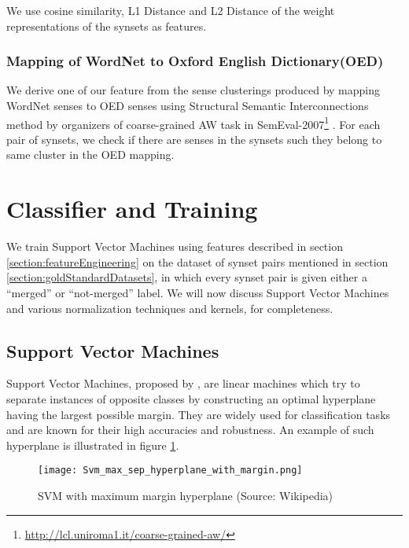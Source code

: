 We use cosine similarity, L1 Distance and L2 Distance of the weight representations of the synsets as features.

\subsubsection{Mapping of WordNet to Oxford English Dictionary(OED)} 
We derive one of our feature from the sense clusterings produced by mapping WordNet senses to OED senses using Structural Semantic Interconnections method \citep{Navigli05SSI} by organizers of coarse-grained AW task in SemEval-2007\footnote{\url{http://lcl.uniroma1.it/coarse-grained-aw/}} \citep{navigli-litkowski:SemEval-2007}. For each pair of synsets, we check if there are senses in the synsets such they belong to same cluster in the OED mapping.

\section{Classifier and Training}
\label{sec:ClassifierAndTraining}
We train Support Vector Machines using features described in section \ref{section:featureEngineering} on the dataset of synset pairs mentioned in section \ref{section:goldStandardDatasets}, in which every synset pair is given either a ``merged'' or ``not-merged'' label. We will now discuss Support Vector Machines and various normalization techniques and kernels, for completeness.

\subsection{Support Vector Machines}
Support Vector Machines, proposed by \citep{vapnikSVM:95}, are linear machines which try to separate instances of opposite classes by constructing an optimal hyperplane having the largest possible margin. They are widely used for classification tasks and are known for their high accuracies and robustness. An example of such hyperplane is illustrated in figure \ref{fig:svm}. 

\begin{figure}[h]
\begin{center}
\texttt{[image: Svm\_max\_sep\_hyperplane\_with\_margin.png]}
\caption{SVM with maximum margin hyperplane (Source: Wikipedia)}
\label{fig:svm}
\end{center}
\end{figure}

